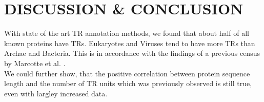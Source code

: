 \documentclass[a4,center,fleqn]{NAR}
\begin{document}
%
%
%
%
%
%
%


%
%



\section{DISCUSSION \& CONCLUSION}
With state of the art TR annotation methods, we found that about half of all known proteins have TRs. Eukaryotes and Viruses tend to have more TRs than Archae and Bacteria. This is in accordance with the findings of a previous census by Marcotte et al. \cite{Marcotte1999}. \\
We could further show, that the positive correlation between protein sequence length and the number of TR units which was previously observed \cite{Marcotte1999} is still true, even with largley increased data.
\end{document}
